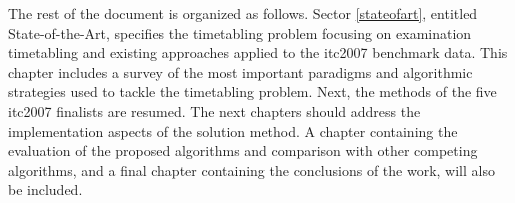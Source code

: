 The rest of the document is organized as follows. Sector \ref{stateofart}, entitled State-of-the-Art, specifies the timetabling problem focusing on examination timetabling and existing approaches applied to the \gls{itc2007} benchmark data. This chapter includes a survey of the most important paradigms and algorithmic strategies used to tackle the timetabling problem. Next, the methods of the five \gls{itc2007} finalists are resumed. The next chapters should address the implementation aspects of the solution method. A chapter containing the evaluation of the proposed algorithms and comparison with other competing algorithms, and a final chapter containing the conclusions of the work, will also be included.